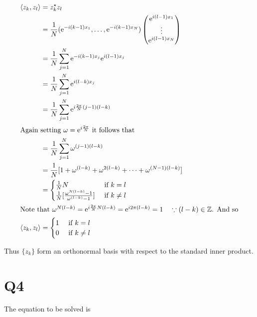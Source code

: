 \documentclass{article}
\newcommand{\Z}{\mathbb{Z}}
\newcommand{\E}{\mathrm{e}}
\begin{document}
\begin{equation*}
	\begin{split}
		\langle z_k, z_l \rangle
		& = z_k^\star z_l \\
		& = \frac{1}{N} ( \E^{ -i (k-1) x_1 } , \dots , \E^{ -i (k-1) x_N } )
		\begin{pmatrix}
			\E^{ i (l-1) x_1 } \\
			\vdots \\
			\E^{ i (l-1) x_N }
		\end{pmatrix} \\
		& = \frac{1}{N} \sum_{j=1}^N \E^{ -i (k-1) x_j } \E^{ i (l-1) x_j } \\
		& = \frac{1}{N} \sum_{j=1}^N \E^{ i (l-k) x_j } \\
		& = \frac{1}{N} \sum_{j=1}^N \E^{ i \frac{2\pi}{N} (j-1) (l-k) }\\
		\intertext{Again setting $\omega = \E^{ i \frac{ 2\pi }{ N } }$ it follows that}
		& = \frac{1}{N} \sum_{j=1}^N \omega^{(j-1) (l-k)} \\
		& = \frac{1}{N} [ 1 + \omega^{(l-k)} + \omega^{2 (l-k)} + \dots + \omega^{(N-1) (l-k)} ] \\
		& = 
		\begin{cases}
		    \frac{1}{N} N
		    & \text{ if } k = l \\
		    \frac{1}{N} [ \frac{ \omega^{N (l-k)} - 1 }{ \omega^{(l-k)} - 1 }]
		    & \text{ if } k \neq l
		\end{cases} \\
		\intertext{Note that $\omega^{N(l-k)} = \E^{ i \frac{2\pi}{N} N (l-k) } = \E^{ i 2\pi (l-k) } = 1 \quad \because (l-k) \in \Z$. And so}
		\langle z_k, z_l \rangle 
		& = 
		\begin{cases}
		    1
		    & \text{ if } k = l \\
		    0
		    & \text{ if } k \neq l
		\end{cases} 
	\end{split}
\end{equation*}

Thus $\{ z_k \}$ form an orthonormal basis with respect to the standard inner product.  

\newpage
\section{Q4}

The equation to be solved is 
\end{document}

